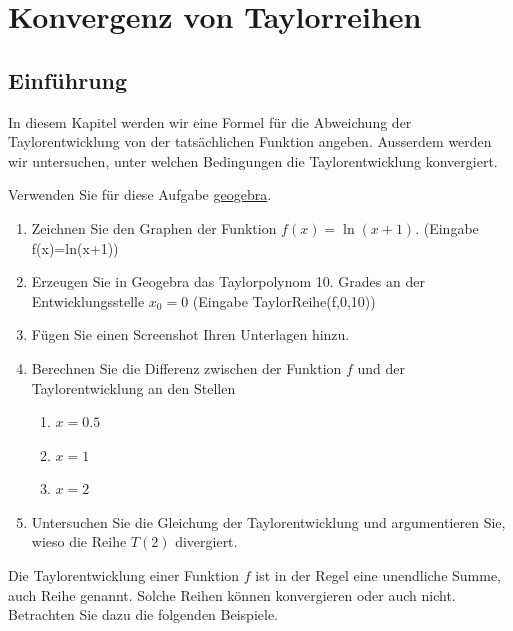\section{Konvergenz von Taylorreihen}
\subsection{Einführung}

In diesem Kapitel werden wir eine Formel für die Abweichung der Taylorentwicklung von der tatsächlichen Funktion angeben. Ausserdem werden wir untersuchen, unter welchen Bedingungen die Taylorentwicklung konvergiert.

\begin{LA}
    {}{}
    Verwenden Sie für diese Aufgabe \href{https://www.geogebra.org}{geogebra}.
    \begin{enumerate}
        \item Zeichnen Sie den Graphen der Funktion $f(x)=\ln(x+1)$. (Eingabe f(x)=ln(x+1))
        \item Erzeugen Sie in Geogebra das Taylorpolynom 10. Grades an der Entwicklungsstelle $x_0  =0$ (Eingabe TaylorReihe(f,0,10))
        \item Fügen Sie einen Screenshot Ihren Unterlagen hinzu.
        \item 	Berechnen Sie die Differenz zwischen der Funktion $f$ und der Taylorentwicklung an den Stellen
        \begin{enumerate}
            \item $x=0.5$
            \item $x=1$
            \item $x=2$
        \end{enumerate}
        \item 	Untersuchen Sie die Gleichung der Taylorentwicklung und argumentieren Sie, wieso die Reihe $T(2)$ divergiert.
        
    
    \end{enumerate}

\end{LA}
\clearpage
Die Taylorentwicklung einer Funktion $f$ ist in der Regel eine unendliche Summe, auch Reihe genannt. Solche Reihen können konvergieren oder auch nicht. Betrachten Sie dazu die folgenden Beispiele.
